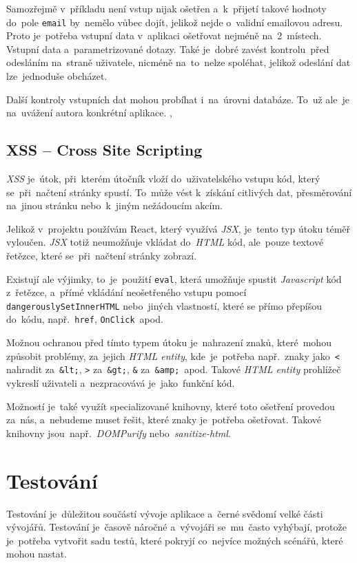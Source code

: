 \documentclass[11pt,a4paper]{report}
\begin{document}
                Samozřejmě v~příkladu není vstup nijak ošetřen a~k~přijetí takové hodnoty do~pole \texttt{email} by~nemělo vůbec dojít, jelikož nejde o~validní emailovou adresu. Proto je~potřeba vstupní data v~aplikaci ošetřovat nejméně na~2~místech. Vstupní data a~parametrizované dotazy. Také je~dobré zavést kontrolu~před odesláním na~straně uživatele, nicméně na~to~nelze spoléhat, jelikož odeslání dat lze~jednoduše obcházet.
                
                Další kontroly vstupních dat mohou probíhat i~na~úrovni databáze. To~už ale~je na~uvážení autora konkrétní aplikace. \cite{w3s:SQLInjection}, \cite{itnetwork:SQLInjection}

            \subsection{XSS -- Cross Site Scripting}
                \emph{XSS} je~útok, při~kterém útočník vloží do~uživatelského vstupu kód, který se~při~načtení stránky spustí. To~může vést k~získání citlivých dat, přesměrování na~jinou stránku nebo~k~jiným nežádoucím akcím.

                Jelikož v~projektu používám React, který využívá \emph{JSX}, je~tento typ útoku téměř vyloučen. \emph{JSX} totiž neumožňuje vkládat do~\emph{HTML} kód, ale~pouze textové řetězce, které se~při~načtení stránky zobrazí.

                Existují ale výjimky, to~je~použití \texttt{eval}, která umožňuje spustit \emph{Javascript} kód z~řetězce, a~přímé vkládání neošetřeného vstupu pomocí \texttt{dangerouslySetInnerHTML} nebo~jiných vlastností, které se přímo přepíšou do~kódu, např.~\texttt{href}, \texttt{OnClick}~apod.

                Možnou ochranou před tímto typem útoku je~nahrazení znaků, které~mohou způsobit problémy, za~jejich \emph{HTML entity}, kde~je~potřeba např.~znaky jako~\texttt{<} nahradit za~\texttt{\&lt;}, \texttt{>} za~\texttt{\&gt;}, \texttt{\&} za~\texttt{\&amp;}~apod. Takové \emph{HTML entity} prohlížeč vykreslí uživateli a~nezpracovává je~jako~funkční kód.
                
                Možností je~také využít specializované knihovny, které toto ošetření provedou za~nás, a~nebudeme muset řešit, které znaky je~potřeba ošetřovat. Takové knihovny jsou~např.~\emph{DOMPurify} nebo~\emph{sanitize-html}. \cite{medium:XSS}

        \section{Testování}
            Testování je~důležitou součástí vývoje aplikace a~černé svědomí velké části vývojářů. Testování je~časově náročné a~vývojáři se~mu~často vyhýbají, protože je~potřeba vytvořit sadu testů, které pokryjí co~nejvíce možných scénářů, které mohou nastat.
            
\end{document}
